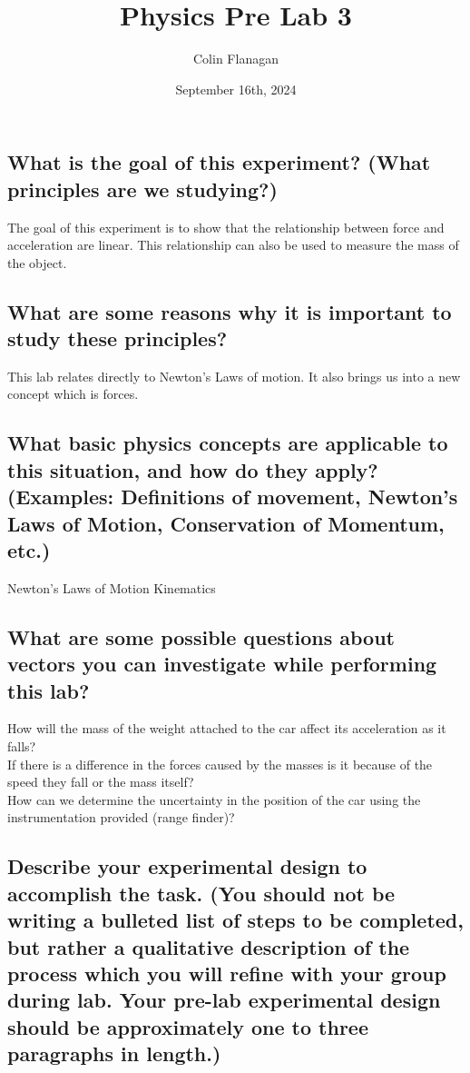 \documentclass{article}
\title{Physics Pre Lab 3}
\author{Colin Flanagan}
\date{September 16th, 2024}
\begin{document}
\maketitle

\subsection*{What is the goal of this experiment? (What principles are we studying?)}

    The goal of this experiment is to show that the relationship between force and acceleration are linear. This relationship can also be used to measure the mass of the object.
    

\subsection*{What are some reasons why it is important to study these principles?
}

    This lab relates directly to Newton's Laws of motion. It also brings us into a new concept which is forces.
    
\subsection*{What basic physics concepts are applicable to this situation, and how do they apply? (Examples: Definitions of movement, Newton’s Laws of Motion, Conservation of Momentum, etc.)}

    Newton's Laws of Motion
    Kinematics

\subsection*{What are some possible questions about vectors you can investigate while performing this lab?
}

   How will the mass of the weight attached to the car affect its acceleration as it falls? \\
   
   If there is a difference in the forces caused by the masses is it because of the speed they fall or the mass itself?\\

   How can we determine the uncertainty in the position of the car using the instrumentation provided (range finder)?\\

\subsection*{Describe your experimental design to accomplish the task. (You should not be writing a bulleted list of steps to be completed, but rather a qualitative description of the process which you will refine with your group during lab. Your pre-lab experimental design should be approximately one to three paragraphs in length.)}
\end{document}
